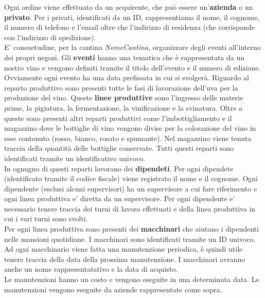 Ogni ordine viene effettuato da un acquirente, che può essere un'\textbf{azienda} o un \textbf{privato}. Per i privati, identificati da un ID, rappresentiamo il nome, il cognome, il numero di telefono e l'email oltre che l'indirizzo di residenza (che corrisponde con l'indirizzo di spedizione).\\
E' consuetudine, per la cantina \emph{NomeCantina}, organizzare degli eventi all'interno dei propri negozi. Gli \textbf{eventi} hanno una tematica che è rappresentata da un nostro vino e vengono definiti tramite il titolo dell'evento e il numero di edizione. Ovviamente ogni evento ha una data prefissata in cui si svolgerà.
Riguardo al reparto produttivo sono presenti tutte le fasi di lavorazione dell'uva per la produzione del vino. Queste \textbf{linee produttive} sono l'ingresso delle materie prime, la pigiatura, la fermentazione, la vinificazione e la svinatura. Oltre a queste sono presenti altri reparti produttivi come l'imbottigliamento e il magazzino dove le bottiglie di vino vengono divise per la colorazione del vino in esse contenuto (rosso, bianco, rosato e spumante). Nel magazzino viene tenuta traccia della quantità delle bottiglie conservate. Tutti questi reparti sono identificati tramite un identificativo univoco.\\
In ognugno di questi reparti lavorano dei \textbf{dipendeti}. Per ogni dipendete (identificato tramite il codice fiscale) viene registrato il nome e il cognome. Ogni dipendente (esclusi alcuni supervisori) ha un supervisore a cui fare riferimento e ogni linea produttiva e' diretta da un supervisore. Per ogni dipendente e' necessario tenere traccia dei turni di lavoro effettuati e della linea produttiva in cui i vari turni sono svolti.\\
Per ogni linea produttiva sono presenti dei \textbf{macchinari} che aiutano i dipendenti nelle mansioni quotidiane. I macchinari sono identificati tramite un ID univoco. Ad ogni macchinario viene fatta una manutenzione periodica, è quindi utile tenere traccia della data della prossima manutenzione. I macchinari avranno anche un nome rappresentatativo e la data di acquisto.\\
Le manutenzioni hanno un costo e vengono eseguite in una determinata data. Le manutenzioni vengono eseguite da aziende rappresentate come sopra.